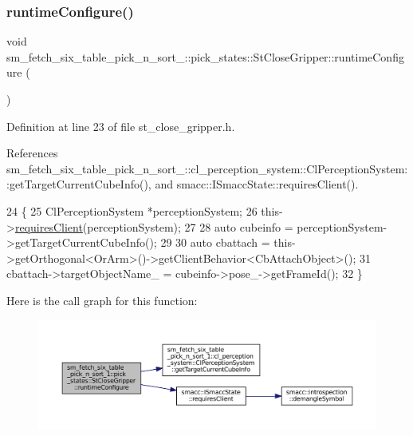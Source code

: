 \subsubsection{\texorpdfstring{runtime\+Configure()}{runtimeConfigure()}}
{\footnotesize\ttfamily void sm\+\_\+fetch\+\_\+six\+\_\+table\+\_\+pick\+\_\+n\+\_\+sort\+\_\+::pick\+\_\+states\+::\+St\+Close\+Gripper\+::runtime\+Configure (\begin{DoxyParamCaption}{ }\end{DoxyParamCaption})\hspace{0.3cm}{\ttfamily [inline]}}



Definition at line 23 of file st\+\_\+close\+\_\+gripper.\+h.



References sm\+\_\+fetch\+\_\+six\+\_\+table\+\_\+pick\+\_\+n\+\_\+sort\+\_\+::cl\+\_\+perception\+\_\+system\+::\+Cl\+Perception\+System\+::get\+Target\+Current\+Cube\+Info(), and smacc\+::\+I\+Smacc\+State\+::requires\+Client().


\begin{DoxyCode}
24          \{
25             ClPerceptionSystem *perceptionSystem;
26             this->\hyperlink{classsmacc_1_1ISmaccState_a7f95c9f0a6ea2d6f18d1aec0519de4ac}{requiresClient}(perceptionSystem);
27 
28             \textcolor{keyword}{auto} cubeinfo = perceptionSystem->getTargetCurrentCubeInfo();
29 
30             \textcolor{keyword}{auto} cbattach = this->getOrthogonal<OrArm>()->getClientBehavior<CbAttachObject>();
31             cbattach->targetObjectName\_ = cubeinfo->pose\_->getFrameId();
32          \}
\end{DoxyCode}
Here is the call graph for this function\+:
\nopagebreak
\begin{figure}[H]
\begin{center}
\leavevmode
\includegraphics[width=350pt]{structsm__fetch__six__table__pick__n__sort__1_1_1pick__states_1_1StCloseGripper_ada992443b10f8414a0b0c58ddde4ab62_cgraph}
\end{center}
\end{figure}
\mbox{\label{structsm__fetch__six__table__pick__n__sort__1_1_1pick__states_1_1StCloseGripper_a5d9eec8a463cf75e607b8ca155ad8f9c}} 

